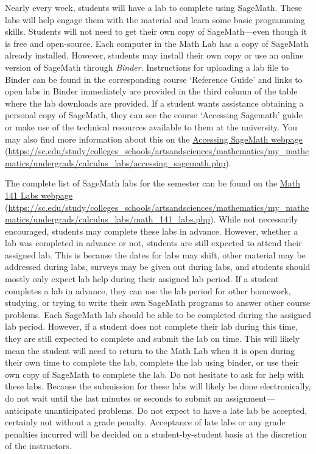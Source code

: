\documentclass[11pt,letterpaper]{article}
\begin{document}
Nearly every week, students will have a lab to complete using SageMath. These labs will help engage them with the material and learn some basic programming skills. Students will not need to get their own copy of SageMath---even though it is free and open-source. Each computer in the Math Lab has a copy of SageMath already installed. However, students may install their own copy or use an online version of SageMath through \textit{Binder}. Instructions for uploading a lab file to Binder can be found in the corresponding course `Reference Guide' and links to open labs in Binder immediately are provided in the third column of the table where the lab downloads are provided. If a student wants assistance obtaining a personal copy of SageMath, they can see the course `Accessing Sagemath' guide or make use of the technical resources available to them at the university. You may also find more information about this on the \href{https://sc.edu/study/colleges\_schools/artsandsciences/mathematics/my\_mathematics/undergrads/calculus\_labs/accessing\_sagemath.php}{Accessing SageMath webpage} (\url{https://sc.edu/study/colleges\_schools/artsandsciences/mathematics/my\_mathematics/undergrads/calculus\_labs/accessing\_sagemath.php}). \pspace

The complete list of SageMath labs for the semester can be found on the \href{https://sc.edu/study/colleges\_schools/artsandsciences/mathematics/my\_mathematics/undergrads/calculus_labs/math\_141\_labs.php}{Math 141 Labs webpage} (\url{https://sc.edu/study/colleges\_schools/artsandsciences/mathematics/my\_mathematics/undergrads/calculus\_labs/math\_141\_labs.php}). While not necessarily encouraged, students may complete these labs in advance. However, whether a lab was completed in advance or not, students are still expected to attend their assigned lab. This is because the dates for labs may shift, other material may be addressed during labs, surveys may be given out during labs, and students should mostly only expect lab help during their assigned lab period. If a student completes a lab in advance, they can use the lab period for other homework, studying, or trying to write their own SageMath programs to answer other course problems. Each SageMath lab should be able to be completed during the assigned lab period. However, if a student does not complete their lab during this time, they are still expected to complete and submit the lab on time. This will likely mean the student will need to return to the Math Lab when it is open during their own time to complete the lab, complete the lab using binder, or use their own copy of SageMath to complete the lab. Do not hesitate to ask for help with these labs. Because the submission for these labs will likely be done electronically, do not wait until the last minutes or seconds to submit an assignment---anticipate unanticipated problems. Do not expect to have a late lab be accepted, certainly not without a grade penalty. Acceptance of late labs or any grade penalties incurred will be decided on a student-by-student basis at the discretion of the instructors. 
\sectionbreak
\end{document}
